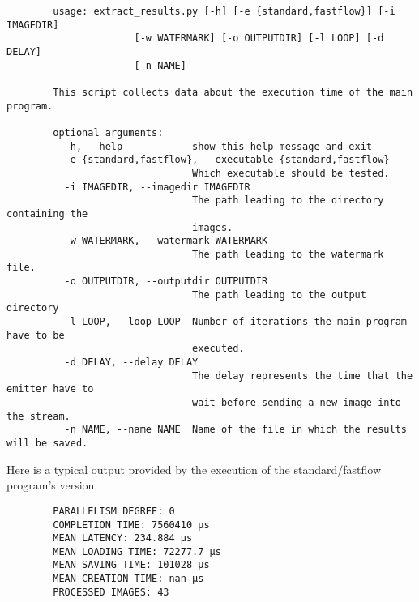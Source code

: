     \begin{verbatim}
        usage: extract_results.py [-h] [-e {standard,fastflow}] [-i IMAGEDIR]
                      [-w WATERMARK] [-o OUTPUTDIR] [-l LOOP] [-d DELAY]
                      [-n NAME]

        This script collects data about the execution time of the main program.

        optional arguments:
          -h, --help            show this help message and exit
          -e {standard,fastflow}, --executable {standard,fastflow}
                                Which executable should be tested.
          -i IMAGEDIR, --imagedir IMAGEDIR
                                The path leading to the directory containing the
                                images.
          -w WATERMARK, --watermark WATERMARK
                                The path leading to the watermark file.
          -o OUTPUTDIR, --outputdir OUTPUTDIR
                                The path leading to the output directory
          -l LOOP, --loop LOOP  Number of iterations the main program have to be
                                executed.
          -d DELAY, --delay DELAY
                                The delay represents the time that the emitter have to
                                wait before sending a new image into the stream.
          -n NAME, --name NAME  Name of the file in which the results will be saved.
    \end{verbatim}

    Here is a typical output provided by the execution of the standard/fastflow program's version.

    \begin{verbatim}
        PARALLELISM DEGREE: 0
        COMPLETION TIME: 7560410 μs
        MEAN LATENCY: 234.884 μs
        MEAN LOADING TIME: 72277.7 μs
        MEAN SAVING TIME: 101028 μs
        MEAN CREATION TIME: nan μs
        PROCESSED IMAGES: 43
    \end{verbatim}
